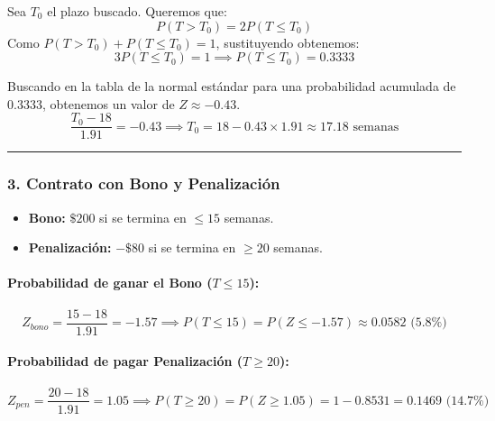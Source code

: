 \documentclass[
]{article}
\providecommand{\tightlist}{%
  \setlength{\itemsep}{0pt}\setlength{\parskip}{0pt}}
\begin{document}
Sea \(T_0\) el plazo buscado. Queremos que:
\[P(T > T_0) = 2 P(T \le T_0)\] Como \(P(T > T_0) + P(T \le T_0) = 1\),
sustituyendo obtenemos:
\[3 P(T \le T_0) = 1 \implies P(T \le T_0) = 0.3333\]

Buscando en la tabla de la normal estándar para una probabilidad
acumulada de \(0.3333\), obtenemos un valor de \(Z \approx -0.43\).
\[\frac{T_0 - 18}{1.91} = -0.43 \implies T_0 = 18 - 0.43 \times 1.91 \approx 17.18 \text{ semanas}\]

\begin{center}\rule{0.5\linewidth}{0.5pt}\end{center}

\hypertarget{contrato-con-bono-y-penalizaciuxf3n}{%
\subsubsection{3. Contrato con Bono y
Penalización}\label{contrato-con-bono-y-penalizaciuxf3n}}

\begin{itemize}
\tightlist
\item
  \textbf{Bono:} \(\$200\) si se termina en \(\le 15\) semanas.
\item
  \textbf{Penalización:} \(-\$80\) si se termina en \(\ge 20\) semanas.
\end{itemize}

\hypertarget{probabilidad-de-ganar-el-bono-t-le-15}{%
\paragraph{\texorpdfstring{Probabilidad de ganar el Bono
(\(T \le 15\)):}{Probabilidad de ganar el Bono (T \textbackslash le 15):}}\label{probabilidad-de-ganar-el-bono-t-le-15}}

\[Z_{bono} = \frac{15 - 18}{1.91} = -1.57 \implies P(T \le 15) = P(Z \le -1.57) \approx 0.0582 \text{ (5.8\%)}\]

\hypertarget{probabilidad-de-pagar-penalizaciuxf3n-t-ge-20}{%
\paragraph{\texorpdfstring{Probabilidad de pagar Penalización
(\(T \ge 20\)):}{Probabilidad de pagar Penalización (T \textbackslash ge 20):}}\label{probabilidad-de-pagar-penalizaciuxf3n-t-ge-20}}

\[Z_{pen} = \frac{20 - 18}{1.91} = 1.05 \implies P(T \ge 20) = P(Z \ge 1.05) = 1 - 0.8531 = 0.1469 \text{ (14.7\%)}\]
\end{document}
